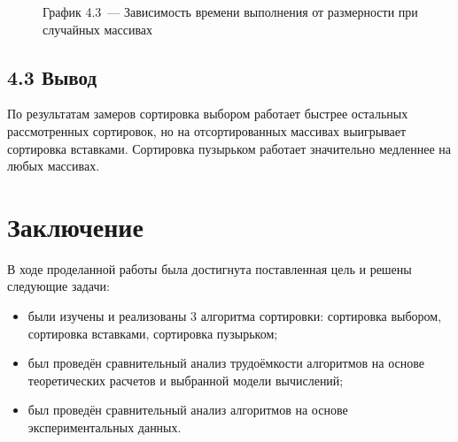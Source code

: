 \documentclass[12pt, a4paper]{report}
\begin{document}
\begin{figure}[H]
\caption*{График 4.3~--- Зависимость времени выполнения от размерности при случайных массивах}
\end{figure}

\section*{4.3 Вывод}

По результатам замеров сортировка выбором работает быстрее остальных рассмотренных сортировок, но на отсортированных массивах выигрывает сортировка вставками.
Сортировка пузырьком работает значительно медленнее на любых массивах.


\chapter*{Заключение}

В ходе проделанной работы была достигнута поставленная цель и решены следующие задачи:

\begin{itemize}
	\item были изучены и реализованы 3 алгоритма сортировки: сортировка выбором, сортировка вставками, сортировка пузырьком;
	\item был проведён сравнительный анализ трудоёмкости алгоритмов на основе теоретических расчетов и выбранной модели вычислений;
	\item был проведён сравнительный анализ алгоритмов на основе экспериментальных данных.
\end{itemize}
\end{document}
